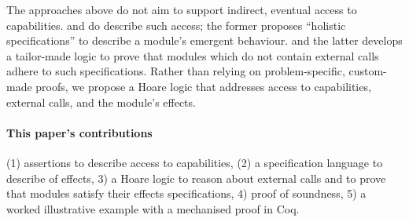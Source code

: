  The approaches above %
 do not aim to support indirect, eventual access to capabilities.
\citet{FASE} and \citet{OOPSLA22} do describe such access; %
  the former proposes  ``holistic specifications'' to describe a module's emergent behaviour. 
and the latter develops 
a tailor-made logic to prove that modules which do not contain external calls adhere to such specifications.
%
%
Rather than relying on problem-specific, custom-made proofs, we propose a Hoare logic that addresses access to capabilities, external calls, and the module's \tamed effects.

  
\paragraph{This paper's contributions} %
{(1) assertions to describe   access to capabilities}, 
(2) a specification language to describe \taming of effects,
3) a Hoare logic to reason about external calls and to prove that modules satisfy their \tamed effects specifications,
4)  proof of soundness,
5) a worked illustrative example {with a mechanised proof in Coq}.
 

